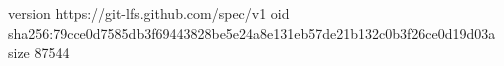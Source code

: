 version https://git-lfs.github.com/spec/v1
oid sha256:79cce0d7585db3f69443828be5e24a8e131eb57de21b132c0b3f26ce0d19d03a
size 87544
